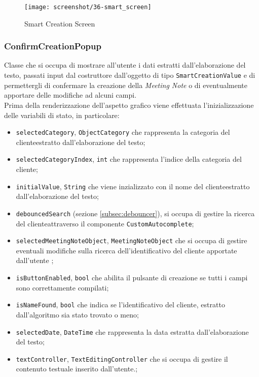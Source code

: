 \begin{figure}[!h] 
    \centering 
    \texttt{[image: screenshot/36-smart\_screen]} 
    \caption{Smart Creation Screen}
    \label{fig:smart-screen}
\end{figure}

\subsubsection*{ConfirmCreationPopup}
\label{subsubsec:confirm-creation-popup}

Classe che si occupa di mostrare all'utente i dati estratti dall'elaborazione del testo, passati input dal costruttore dall'oggetto di tipo \lstinline{SmartCreationValue} e di permettergli di confermare la creazione della \emph{Meeting Note} o di eventualmente apportare delle modifiche ad alcuni campi. \\
Prima della renderizzazione dell'aspetto grafico viene effettuata l'inizializzazione delle variabili di stato, in particolare:
\begin{itemize}
    \item \lstinline{selectedCategory}, \lstinline{ObjectCategory} che rappresenta la categoria del \gls{cliente}\glsoccur estratto dall'elaborazione del testo;
    \item \lstinline{selectedCategoryIndex}, \lstinline{int} che rappresenta l'indice della categoria del \gls{cliente}\glsoccur;
    \item \lstinline{initialValue}, \lstinline{String} che viene inzializzato con il nome del \gls{cliente}\glsoccur estratto dall'elaborazione del testo;
    \item \lstinline{debouncedSearch} (sezione \ref{subsec:debouncer}), si occupa di gestire la ricerca del \gls{cliente}\glsoccur attraverso il componente \lstinline{CustomAutocomplete};
    \item \lstinline{selectedMeetingNoteObject}, \lstinline{MeetingNoteObject} che si occupa di gestire eventuali modifiche sulla ricerca dell'identificativo del cliente apportate dall'utente ;
    \item \lstinline{isButtonEnabled}, \lstinline{bool} che abilita il pulsante di creazione se tutti i campi sono correttamente compilati;
    \item \lstinline{isNameFound}, \lstinline{bool} che indica se l'identificativo del \gls{cliente}\glsoccur, estratto dall'algoritmo sia stato trovato o meno;
    \item \lstinline{selectedDate}, \lstinline{DateTime} che rappresenta la data estratta dall'elaborazione del testo;
    \item \lstinline{textController}, \lstinline{TextEditingController} che si occupa di gestire il contenuto testuale inserito dall'utente.;
\end{itemize}
